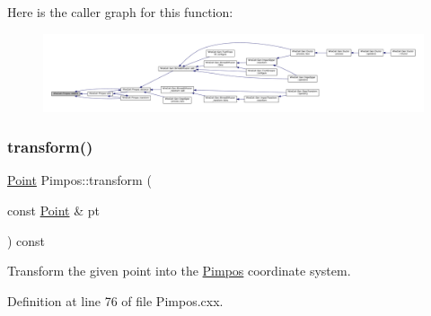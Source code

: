 Here is the caller graph for this function\+:
\nopagebreak
\begin{figure}[H]
\begin{center}
\leavevmode
\includegraphics[width=350pt]{class_wire_cell_1_1_pimpos_a291dda9270d9feb2a0f8afa18e4cf9e2_icgraph}
\end{center}
\end{figure}
\mbox{\label{class_wire_cell_1_1_pimpos_a0d2db56d6956aee06d0218ee50400f25}} 
\subsubsection{\texorpdfstring{transform()}{transform()}}
{\footnotesize\ttfamily \hyperlink{namespace_wire_cell_ab2b2565fa6432efbb4513c14c988cda9}{Point} Pimpos\+::transform (\begin{DoxyParamCaption}\item[{const \hyperlink{namespace_wire_cell_ab2b2565fa6432efbb4513c14c988cda9}{Point} \&}]{pt }\end{DoxyParamCaption}) const}

Transform the given point into the \hyperlink{class_wire_cell_1_1_pimpos}{Pimpos} coordinate system. 

Definition at line 76 of file Pimpos.\+cxx.

